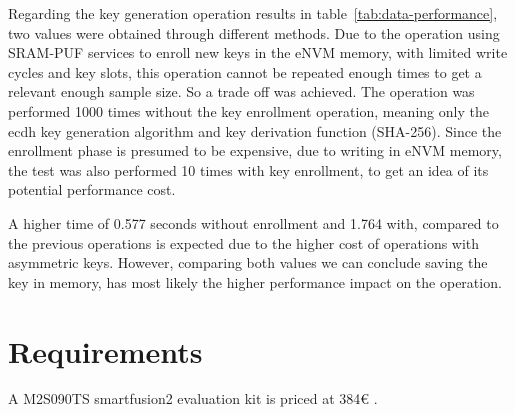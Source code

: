 

Regarding the key generation operation results in table~\ref{tab:data-performance}, two values were obtained through different methods. Due to the operation using SRAM-PUF services to enroll new keys in the eNVM memory, with limited write cycles and key slots, this operation cannot be repeated enough times to get a relevant enough sample size.
So a trade off was achieved. The operation was performed 1000 times without the key enrollment operation, meaning only the ecdh key generation algorithm and key derivation function (SHA-256).
Since the enrollment phase is presumed to be expensive, due to writing in eNVM memory, the test was also performed 10 times with key enrollment, to get an idea of its potential performance cost.

A higher time of 0.577 seconds without enrollment and 1.764 with, compared to the previous operations is expected due to the higher cost of operations with asymmetric keys.
However, comparing both values we can conclude saving the key in memory, has most likely the higher performance impact on the operation.

\section{Requirements}\label{chap:evaluation:requirements}

A M2S090TS smartfusion2 evaluation kit is priced at 384€ \cite{smartfusionPrice}.


